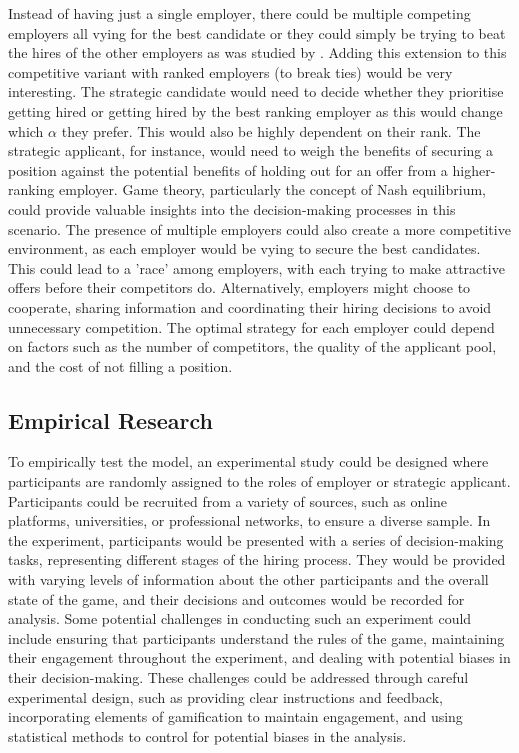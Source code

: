 \documentclass{article}
\begin{document}
Instead of having just a single employer, there could be multiple competing employers all vying for the best candidate or they could simply be trying to beat the hires of the other employers as was studied by \cite{immorlica2011dueling}. Adding this extension to this competitive variant with ranked employers (to break ties) would be very interesting. The strategic candidate would need to decide whether they prioritise getting hired or getting hired by the best ranking employer as this would change which $\alpha$ they prefer. This would also be highly dependent on their rank. The strategic applicant, for instance, would need to weigh the benefits of securing a position against the potential benefits of holding out for an offer from a higher-ranking employer. Game theory, particularly the concept of Nash equilibrium, could provide valuable insights into the decision-making processes in this scenario. The presence of multiple employers could also create a more competitive environment, as each employer would be vying to secure the best candidates. This could lead to a 'race' among employers, with each trying to make attractive offers before their competitors do. Alternatively, employers might choose to cooperate, sharing information and coordinating their hiring decisions to avoid unnecessary competition. The optimal strategy for each employer could depend on factors such as the number of competitors, the quality of the applicant pool, and the cost of not filling a position.

\subsection{Empirical Research}

To empirically test the model, an experimental study could be designed where participants are randomly assigned to the roles of employer or strategic applicant. Participants could be recruited from a variety of sources, such as online platforms, universities, or professional networks, to ensure a diverse sample. In the experiment, participants would be presented with a series of decision-making tasks, representing different stages of the hiring process. They would be provided with varying levels of information about the other participants and the overall state of the game, and their decisions and outcomes would be recorded for analysis. Some potential challenges in conducting such an experiment could include ensuring that participants understand the rules of the game, maintaining their engagement throughout the experiment, and dealing with potential biases in their decision-making. These challenges could be addressed through careful experimental design, such as providing clear instructions and feedback, incorporating elements of gamification to maintain engagement, and using statistical methods to control for potential biases in the analysis.
\end{document}
